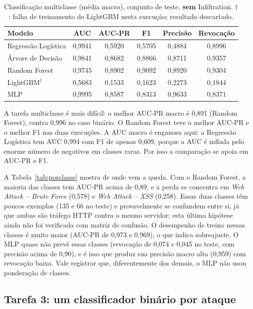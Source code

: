 \begin{table}[ht]
\centering
\caption{Classificação multiclasse (média macro), conjunto de teste, \textbf{sem} Infiltration. $\dagger$: falha de treinamento do LightGBM nesta execução; resultado descartado.}
\begin{tabular}{lccccc}
\toprule
Modelo & AUC & AUC-PR & F1 & Precisão & Revocação \\
\midrule
Regressão Logística & 0,9941 & 0,5920 & 0,5705 & 0,4884 & 0,8996 \\
Árvore de Decisão   & 0,9841 & 0,8682 & 0,8866 & 0,8711 & 0,9357 \\
Random Forest       & 0,9745 & 0,8902 & 0,9092 & 0,8920 & 0,9304 \\
LightGBM$^\dagger$  & 0,5683 & 0,1533 & 0,1623 & 0,2273 & 0,1844 \\
MLP                 & 0,9995 & 0,8587 & 0,8313 & 0,9633 & 0,8371 \\
\bottomrule
\end{tabular}
\end{table}

A tarefa multiclasse é mais difícil: o melhor AUC-PR macro é 0,891 (Random Forest), contra 0,996 no caso binário. O Random Forest teve o melhor AUC-PR e o melhor F1 nas duas execuções. A AUC macro é enganosa aqui: a Regressão Logística tem AUC 0,994 com F1 de apenas 0,609, porque a AUC é inflada pelo enorme número de negativos em classes raras. Por isso a comparação se apoia em AUC-PR e F1.

A Tabela~\ref{tab:porclasse} mostra de onde vem a queda. Com o Random Forest, a maioria das classes tem AUC-PR acima de 0,89, e a perda se concentra em \textit{Web Attack -- Brute Force} (0,578) e \textit{Web Attack -- XSS} (0,258). Essas duas classes têm poucos exemplos (135 e 66 no teste) e provavelmente se confundem entre si, já que ambas são tráfego HTTP contra o mesmo servidor; esta última hipótese ainda não foi verificada com matriz de confusão. O desempenho de treino nessas classes é muito maior (AUC-PR de 0,973 e 0,969), o que indica sobreajuste. O MLP quase não prevê essas classes (revocação de 0,074 e 0,045 no teste, com precisão acima de 0,90), e é isso que produz sua precisão macro alta (0,959) com revocação baixa. Vale registrar que, diferentemente dos demais, o MLP não usou ponderação de classes.

\subsection{Tarefa 3: um classificador binário por ataque}

